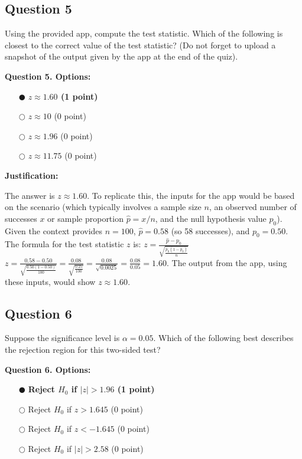 \documentclass[12pt]{article}
\newcommand{\questionsep}{\vspace{1em}}
\begin{document}
\subsection*{Question 5 }
Using the provided app, compute the test statistic. Which of the following is closest to the correct value of the test statistic? (Do not forget to upload a snapshot of the output given by the app at the end of the quiz).

\medskip\noindent\textbf{Question 5. Options:}
\begin{itemize}[leftmargin=2em, labelsep=0.5em, itemsep=0.3em, topsep=0.3em]
    \item[$\mdlgblkcircle$] \textbf{$z \approx 1.60$ (1 point)}
    \item[$\bigcirc$] $z \approx 10$ (0 point)
    \item[$\bigcirc$] $z \approx 1.96$ (0 point)
    \item[$\bigcirc$] $z \approx 11.75$ (0 point)
\end{itemize}

\medskip\noindent\textbf{Justification:}

The answer is $z \approx 1.60$. To replicate this, the inputs for the app would be based on the scenario (which typically involves a sample size $n$, an observed number of successes $x$ or sample proportion $\hat{p} = x/n$, and the null hypothesis value $p_0$). Given the context provides $n=100$, $\hat{p}=0.58$ (so 58 successes), and $p_0=0.50$.
The formula for the test statistic $z$ is:
$z = \frac{\hat{p} - p_0}{\sqrt{\frac{p_0(1-p_0)}{n}}}$
$z = \frac{0.58 - 0.50}{\sqrt{\frac{0.50(1-0.50)}{100}}} = \frac{0.08}{\sqrt{\frac{0.25}{100}}} = \frac{0.08}{\sqrt{0.0025}} = \frac{0.08}{0.05} = 1.60$.
The output from the app, using these inputs, would show $z \approx 1.60$.
\questionsep

\subsection*{Question 6 }
Suppose the significance level is $\alpha = 0.05$. Which of the following best describes the rejection region for this two-sided test?

\medskip\noindent\textbf{Question 6. Options:}
\begin{itemize}[leftmargin=2em, labelsep=0.5em, itemsep=0.3em, topsep=0.3em]
    \item[$\mdlgblkcircle$] \textbf{Reject $H_0$ if $|z| > 1.96$ (1 point)}
    \item[$\bigcirc$] Reject $H_0$ if $z > 1.645$ (0 point)
    \item[$\bigcirc$] Reject $H_0$ if $z < -1.645$ (0 point)
    \item[$\bigcirc$] Reject $H_0$ if $|z| > 2.58$ (0 point)
\end{itemize}
\end{document}
